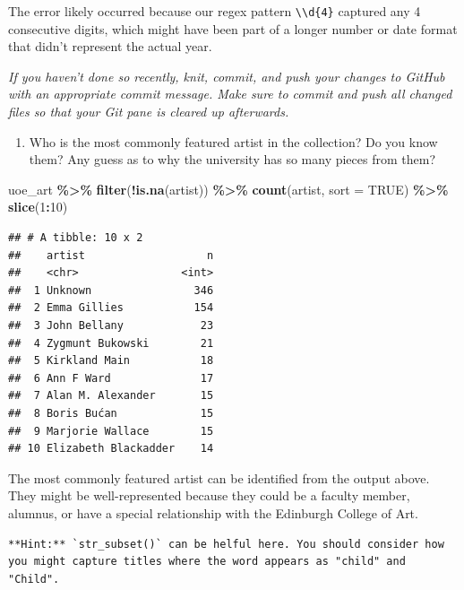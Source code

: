 \documentclass[
]{article}
\newenvironment{Shaded}{\begin{snugshade}}{\end{snugshade}}
\newcommand{\AttributeTok}[1]{\textcolor[rgb]{0.13,0.29,0.53}{#1}}
\newcommand{\ConstantTok}[1]{\textcolor[rgb]{0.56,0.35,0.01}{#1}}
\newcommand{\DecValTok}[1]{\textcolor[rgb]{0.00,0.00,0.81}{#1}}
\newcommand{\FunctionTok}[1]{\textcolor[rgb]{0.13,0.29,0.53}{\textbf{#1}}}
\newcommand{\NormalTok}[1]{#1}
\newcommand{\SpecialCharTok}[1]{\textcolor[rgb]{0.81,0.36,0.00}{\textbf{#1}}}
\providecommand{\tightlist}{%
  \setlength{\itemsep}{0pt}\setlength{\parskip}{0pt}}
\begin{document}
The error likely occurred because our regex pattern
\texttt{\textbackslash{}\textbackslash{}d\{4\}} captured any 4
consecutive digits, which might have been part of a longer number or
date format that didn't represent the actual year.

\emph{If you haven't done so recently, knit, commit, and push your
changes to GitHub with an appropriate commit message. Make sure to
commit and push all changed files so that your Git pane is cleared up
afterwards.}

\begin{enumerate}
\def\labelenumi{\arabic{enumi}.}
\setcounter{enumi}{12}
\tightlist
\item
  Who is the most commonly featured artist in the collection? Do you
  know them? Any guess as to why the university has so many pieces from
  them?
\end{enumerate}

\begin{Shaded}
\begin{Highlighting}[]
\NormalTok{uoe\_art }\SpecialCharTok{\%\textgreater{}\%}
  \FunctionTok{filter}\NormalTok{(}\SpecialCharTok{!}\FunctionTok{is.na}\NormalTok{(artist)) }\SpecialCharTok{\%\textgreater{}\%}
  \FunctionTok{count}\NormalTok{(artist, }\AttributeTok{sort =} \ConstantTok{TRUE}\NormalTok{) }\SpecialCharTok{\%\textgreater{}\%}
  \FunctionTok{slice}\NormalTok{(}\DecValTok{1}\SpecialCharTok{:}\DecValTok{10}\NormalTok{)}
\end{Highlighting}
\end{Shaded}

\begin{verbatim}
## # A tibble: 10 x 2
##    artist                   n
##    <chr>                <int>
##  1 Unknown                346
##  2 Emma Gillies           154
##  3 John Bellany            23
##  4 Zygmunt Bukowski        21
##  5 Kirkland Main           18
##  6 Ann F Ward              17
##  7 Alan M. Alexander       15
##  8 Boris Bućan             15
##  9 Marjorie Wallace        15
## 10 Elizabeth Blackadder    14
\end{verbatim}

The most commonly featured artist can be identified from the output
above. They might be well-represented because they could be a faculty
member, alumnus, or have a special relationship with the Edinburgh
College of Art.

\begin{verbatim}
**Hint:** `str_subset()` can be helful here. You should consider how you might capture titles where the word appears as "child" and "Child".
\end{verbatim}
\end{document}
